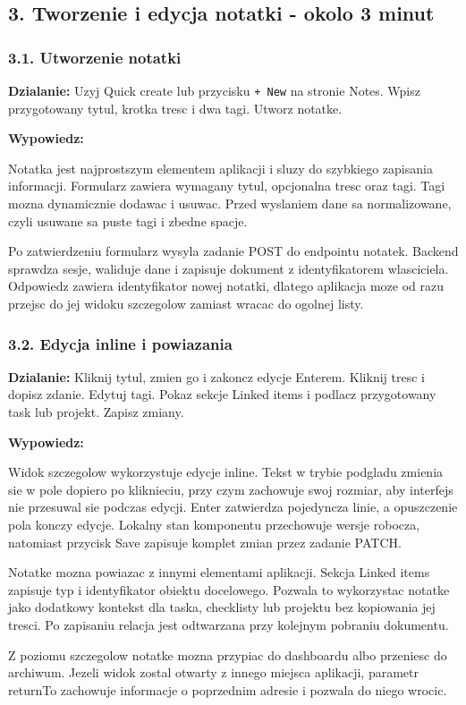 \documentclass[
  polish,
  12pt,
  a4paper,
]{article}
\renewenvironment{quote}
  {\list{}{\leftmargin=1.2em\rightmargin=0.6em}%
   \item\relax\color{black}\setlength{\parskip}{0.7em}}
  {\endlist}
\begin{document}
\subsection{3. Tworzenie i edycja notatki - okolo 3
minut}\label{3-tworzenie-i-edycja-notatki---okolo-3-minut}

\subsubsection{3.1. Utworzenie notatki}\label{31-utworzenie-notatki}

\textbf{Dzialanie:} Uzyj Quick create lub przycisku \texttt{+\ New} na
stronie Notes. Wpisz przygotowany tytul, krotka tresc i dwa tagi. Utworz
notatke.

\textbf{Wypowiedz:}

\begin{quote}
Notatka jest najprostszym elementem aplikacji i sluzy do szybkiego
zapisania informacji. Formularz zawiera wymagany tytul, opcjonalna tresc
oraz tagi. Tagi mozna dynamicznie dodawac i usuwac. Przed wyslaniem dane
sa normalizowane, czyli usuwane sa puste tagi i zbedne spacje.

Po zatwierdzeniu formularz wysyla zadanie POST do endpointu notatek.
Backend sprawdza sesje, waliduje dane i zapisuje dokument z
identyfikatorem wlasciciela. Odpowiedz zawiera identyfikator nowej
notatki, dlatego aplikacja moze od razu przejsc do jej widoku szczegolow
zamiast wracac do ogolnej listy.
\end{quote}

\subsubsection{3.2. Edycja inline i
powiazania}\label{32-edycja-inline-i-powiazania}

\textbf{Dzialanie:} Kliknij tytul, zmien go i zakoncz edycje Enterem.
Kliknij tresc i dopisz zdanie. Edytuj tagi. Pokaz sekcje Linked items i
podlacz przygotowany task lub projekt. Zapisz zmiany.

\textbf{Wypowiedz:}

\begin{quote}
Widok szczegolow wykorzystuje edycje inline. Tekst w trybie podgladu
zmienia sie w pole dopiero po kliknieciu, przy czym zachowuje swoj
rozmiar, aby interfejs nie przesuwal sie podczas edycji. Enter
zatwierdza pojedyncza linie, a opuszczenie pola konczy edycje. Lokalny
stan komponentu przechowuje wersje robocza, natomiast przycisk Save
zapisuje komplet zmian przez zadanie PATCH.

Notatke mozna powiazac z innymi elementami aplikacji. Sekcja Linked
items zapisuje typ i identyfikator obiektu docelowego. Pozwala to
wykorzystac notatke jako dodatkowy kontekst dla taska, checklisty lub
projektu bez kopiowania jej tresci. Po zapisaniu relacja jest odtwarzana
przy kolejnym pobraniu dokumentu.

Z poziomu szczegolow notatke mozna przypiac do dashboardu albo przeniesc
do archiwum. Jezeli widok zostal otwarty z innego miejsca aplikacji,
parametr returnTo zachowuje informacje o poprzednim adresie i pozwala do
niego wrocic.
\end{quote}
\end{document}
